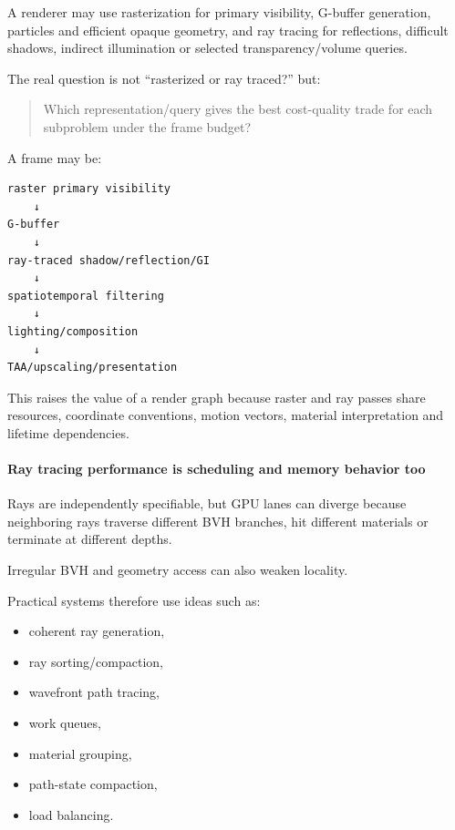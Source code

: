 \hypertarget{03-visual-computing-i-ch001-hybrid-rendering-is-a-deliberate-decomposition-not-an-embarrassing-halfway-state}{}

A renderer may use rasterization for primary visibility, G-buffer generation, particles and efficient opaque geometry, and ray tracing for reflections, difficult shadows, indirect illumination or selected transparency/volume queries.

The real question is not ``rasterized or ray traced?'' but:

\begin{quote}
Which representation/query gives the best cost-quality trade for each subproblem under the frame budget?
\end{quote}

A frame may be:

\begin{verbatim}
raster primary visibility
    ↓
G-buffer
    ↓
ray-traced shadow/reflection/GI
    ↓
spatiotemporal filtering
    ↓
lighting/composition
    ↓
TAA/upscaling/presentation
\end{verbatim}

This raises the value of a render graph because raster and ray passes share resources, coordinate conventions, motion vectors, material interpretation and lifetime dependencies.

\paragraph{Ray tracing performance is scheduling and memory behavior too}\label{03-visual-computing-i-ch001-ray-tracing-performance-is-scheduling-and-memory-behavior-too}

\hypertarget{03-visual-computing-i-ch001-ray-tracing-performance-is-scheduling-and-memory-behavior-too}{}

Rays are independently specifiable, but GPU lanes can diverge because neighboring rays traverse different BVH branches, hit different materials or terminate at different depths.

Irregular BVH and geometry access can also weaken locality.

Practical systems therefore use ideas such as:

\begin{itemize}
\tightlist
\item
  coherent ray generation,
\item
  ray sorting/compaction,
\item
  wavefront path tracing,
\item
  work queues,
\item
  material grouping,
\item
  path-state compaction,
\item
  load balancing.
\end{itemize}

